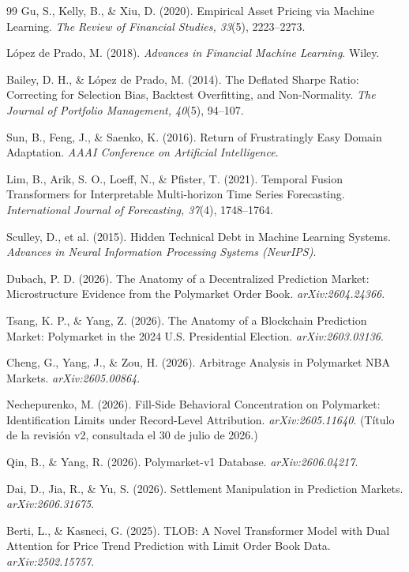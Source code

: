 \begin{thebibliography}{99}
Gu, S., Kelly, B., \& Xiu, D. (2020). Empirical Asset Pricing via Machine Learning.
\textit{The Review of Financial Studies, 33}(5), 2223--2273.

López de Prado, M. (2018). \textit{Advances in Financial Machine Learning}. Wiley.

Bailey, D. H., \& López de Prado, M. (2014). The Deflated Sharpe Ratio: Correcting for
Selection Bias, Backtest Overfitting, and Non-Normality. \textit{The Journal of
Portfolio Management, 40}(5), 94--107.

Sun, B., Feng, J., \& Saenko, K. (2016). Return of Frustratingly Easy Domain Adaptation.
\textit{AAAI Conference on Artificial Intelligence}.

Lim, B., Arik, S. O., Loeff, N., \& Pfister, T. (2021). Temporal Fusion Transformers for
Interpretable Multi-horizon Time Series Forecasting. \textit{International Journal of
Forecasting, 37}(4), 1748--1764.

Sculley, D., et al. (2015). Hidden Technical Debt in Machine Learning Systems.
\textit{Advances in Neural Information Processing Systems (NeurIPS)}.

Dubach, P. D. (2026). The Anatomy of a Decentralized Prediction Market:
Microstructure Evidence from the Polymarket Order Book. \textit{arXiv:2604.24366}.

Tsang, K. P., \& Yang, Z. (2026). The Anatomy of a Blockchain Prediction Market:
Polymarket in the 2024 U.S. Presidential Election. \textit{arXiv:2603.03136}.

Cheng, G., Yang, J., \& Zou, H. (2026). Arbitrage Analysis in Polymarket NBA Markets.
\textit{arXiv:2605.00864}.

Nechepurenko, M. (2026). Fill-Side Behavioral Concentration on Polymarket:
Identification Limits under Record-Level Attribution. \textit{arXiv:2605.11640}.
(Título de la revisión v2, consultada el 30 de julio de 2026.)

Qin, B., \& Yang, R. (2026). Polymarket-v1 Database. \textit{arXiv:2606.04217}.

Dai, D., Jia, R., \& Yu, S. (2026). Settlement Manipulation in Prediction Markets.
\textit{arXiv:2606.31675}.

Berti, L., \& Kasneci, G. (2025). TLOB: A Novel Transformer Model with Dual Attention
for Price Trend Prediction with Limit Order Book Data. \textit{arXiv:2502.15757}.


\end{thebibliography}
